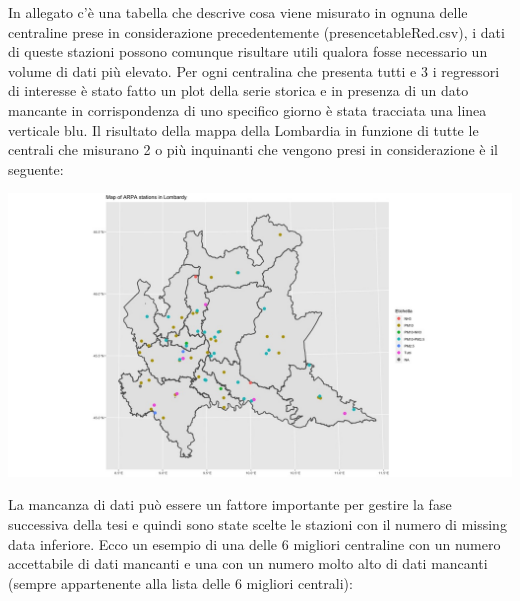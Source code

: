 \documentclass{article}
\begin{document}
In allegato c'è una tabella che descrive cosa viene misurato in ognuna
delle centraline prese in considerazione precedentemente (presencetableRed.csv), i dati di queste stazioni possono comunque risultare utili qualora fosse necessario un volume di dati più elevato.
Per ogni centralina che presenta tutti e 3 i regressori di interesse è stato fatto
un plot della serie storica e in presenza di un dato mancante in corrispondenza
di uno specifico giorno è stata tracciata una linea verticale blu.
Il risultato della mappa della Lombardia in funzione di tutte le centrali che misurano 2 o più inquinanti che 
vengono presi in considerazione è il seguente:

\includegraphics[scale=0.35]{Picture/mappina.jpeg}

La mancanza di dati può essere un fattore importante per gestire la fase successiva della tesi
e quindi sono state scelte le stazioni con il numero di missing data inferiore.
Ecco un esempio di una  delle 6 migliori centraline con un numero accettabile di dati mancanti e una con
un numero molto alto di dati mancanti (sempre appartenente alla lista delle 6 migliori centrali):
\end{document}
